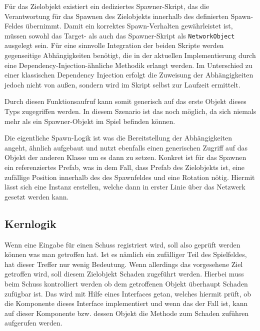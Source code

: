 Für das Zielobjekt existiert ein dediziertes Spawner-Skript, das die Verantwortung für das Spawnen des Zielobjekts innerhalb des definierten Spawn-Feldes übernimmt. Damit ein korrektes Spawn-Verhalten gewährleistet ist, müssen sowohl das Target- als auch das Spawner-Skript als \texttt{NetworkObject} ausgelegt sein. Für eine sinnvolle Integration der beiden Skripte werden gegenseitige Abhängigkeiten benötigt, die in der aktuellen Implementierung durch eine Dependency-Injection-ähnliche Methodik erlangt werden. Im Unterschied zu einer klassischen Dependency Injection erfolgt die Zuweisung der Abhängigkeiten jedoch nicht von außen, sondern wird im Skript selbst zur Laufzeit ermittelt.

Durch diesen Funktionsaufruf kann somit generisch auf das erste Objekt dieses Typs zugegriffen werden. In diesem Szenario ist das noch möglich, da sich niemals mehr als ein Spawner-Objekt im Spiel befinden können. 

Die eigentliche Spawn-Logik ist was die Bereitstellung der Abhängigkeiten angeht, ähnlich aufgebaut und nutzt ebenfalls einen generischen Zugriff auf das Objekt der anderen Klasse um es dann zu setzen. 
Konkret ist für das Spawnen ein referenziertes Prefab, was in dem Fall, dass Prefab des Zielobjekts ist, eine zufällige Position innerhalb des des Spawnfeldes und eine Rotation nötig. Hiermit lässt sich eine Instanz erstellen, welche dann in erster Linie über das Netzwerk gesetzt werden kann.




\subsection{Kernlogik}
Wenn eine Eingabe für einen Schuss registriert wird, soll also geprüft werden können was man getroffen hat. Ist es nämlich ein zufälliger Teil des Spielfeldes, hat dieser Treffer nur wenig Bedeutung. 
Wenn allerdings das vorgesehene Ziel getroffen wird, soll diesem Zielobjekt Schaden zugeführt werden. Hierbei muss beim Schuss kontrolliert werden ob dem getroffenen Objekt überhaupt Schaden zufügbar ist. Das wird mit Hilfe eines Interfaces getan, welches hiermit prüft, ob die Komponente dieses Interface implementiert und wenn das der Fall ist, kann auf dieser Komponente bzw. dessen Objekt die Methode zum Schaden zuführen aufgerufen werden.



